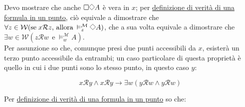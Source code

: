 \documentclass[a4paper,12pt]{article}
\newcommand{\Dmd}{\mathord{\vcenter{\hbox{\tikz[baseline=-0.6ex]{\draw[line width=0.4pt, scale=1, rotate=45] (0,0) rectangle (0.2,0.2);}}}}} %
\begin{document}
\begin{dimo}
\begin{enumerate}
\begin{minipage}{0.48\textwidth}
		\end{minipage}
		\vspace{8pt}
		
		Devo mostrare che anche $\Box \Dmd A$ è vera in $x$; per \hyperlink{defverp}{definizione di verità di una formula in un punto}, ciò equivale a dimostrare che $\forall z \in \mathcal{W} (\text{se} \; x\mathcal{R}z  \text{, allora} \: \vDash_z^{\mathcal{M}} \Dmd A)$, che a sua volta equivale a dimostrare che $\exists w \in \mathcal{W} (z\mathcal{R}w \;\, \text{e} \; \vDash_w^{\mathcal{M}} A)$.\\
		Per assunzione so che, comunque presi due punti accessibili da $x$, esisterà un terzo punto accessibile da entrambi; un caso particolare di questa proprietà è quello in cui i due punti sono lo stesso punto, in questo caso $y$: 
		
		\begin{minipage}{0.48\textwidth}
			$$x\mathcal{R}y \land x\mathcal{R}y \to \exists w (y\mathcal{R}w \land y\mathcal{R}w)$$
		\end{minipage}
		\begin{minipage}{0.48\textwidth}
			\begin{center}
			\end{center}
		\end{minipage}
		\vspace{0pt}
		
		Per \hyperlink{defverp}{definizione di verità di una formula in un punto} so che:
		

\end{enumerate}
\end{dimo}
\end{document}
